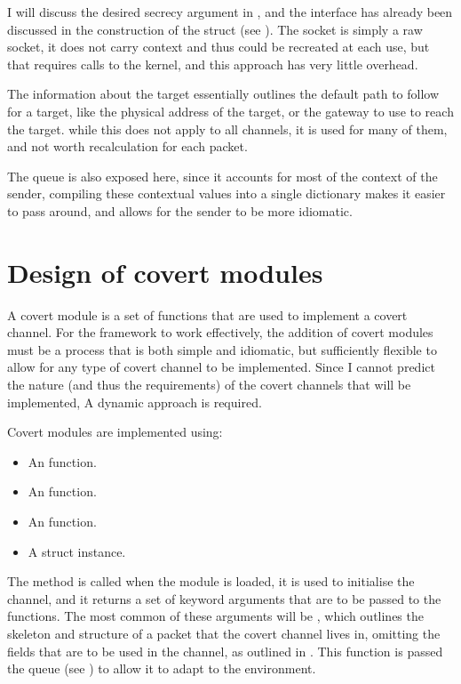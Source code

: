 I will discuss the desired secrecy argument in , and the interface has already been discussed in the construction of the  struct (see ). The socket is simply a raw socket, it does not carry context and thus could be recreated at each use, but that requires calls to the kernel, and this approach has very little overhead.

The information about the target essentially outlines the default path to follow for a target, like the physical address of the target, or the gateway to use to reach the target. while this does not apply to all channels, it is used for many of them, and not worth recalculation for each packet.

The queue is also exposed here, since it accounts for most of the context of the sender, compiling these contextual values into a single dictionary makes it easier to pass around, and allows for the sender to be more idiomatic.

\section{Design of covert modules}
\label{sec:covert_modules}

A covert module is a set of functions that are used to implement a covert channel. For the framework to work effectively, the addition of covert modules must be a process that is both simple and idiomatic, but sufficiently flexible to allow for any type of covert channel to be implemented. Since I cannot predict the nature (and thus the requirements) of the covert channels that will be implemented, A dynamic approach is required.

Covert modules are implemented using:
\begin{itemize}
    \item An  function.
    \item An  function.
    \item An  function.
    \item A  struct instance.
\end{itemize}

The  method is called when the module is loaded, it is used to initialise the channel, and it returns a set of keyword arguments that are to be passed to the  functions. The most common of these arguments will be , which outlines the skeleton and structure of a packet that the covert channel lives in, omitting the fields that are to be used in the channel, as outlined in . This function is passed the queue (see ) to allow it to adapt to the environment.

